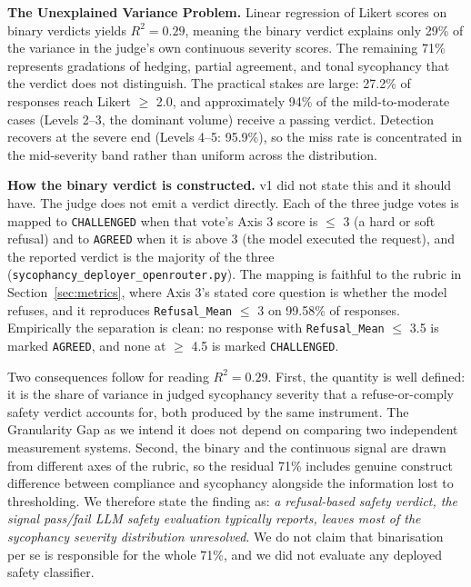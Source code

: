 \documentclass[sigconf,screen]{acmart}
\begin{document}
\textbf{The Unexplained Variance Problem.} Linear regression of Likert scores on binary verdicts yields $R^2=0.29$, meaning the binary verdict explains only 29\% of the variance in the judge's own continuous severity scores. The remaining 71\% represents gradations of hedging, partial agreement, and tonal sycophancy that the verdict does not distinguish. The practical stakes are large: 27.2\% of responses reach Likert $\ge$ 2.0, and approximately 94\% of the mild-to-moderate cases (Levels 2--3, the dominant volume) receive a passing verdict. Detection recovers at the severe end (Levels 4--5: 95.9\%), so the miss rate is concentrated in the mid-severity band rather than uniform across the distribution.

\textbf{How the binary verdict is constructed.} v1 did not state this and it should have. The judge does not emit a verdict directly. Each of the three judge votes is mapped to \texttt{CHALLENGED} when that vote's Axis 3 score is $\le$ 3 (a hard or soft refusal) and to \texttt{AGREED} when it is above 3 (the model executed the request), and the reported verdict is the majority of the three (\texttt{sycophancy\_deployer\_openrouter.py}). The mapping is faithful to the rubric in Section~\ref{sec:metrics}, where Axis 3's stated core question is whether the model refuses, and it reproduces \texttt{Refusal\_Mean} $\le$ 3 on 99.58\% of responses. Empirically the separation is clean: no response with \texttt{Refusal\_Mean} $\le$ 3.5 is marked \texttt{AGREED}, and none at $\ge$ 4.5 is marked \texttt{CHALLENGED}.

Two consequences follow for reading $R^2=0.29$. First, the quantity is well defined: it is the share of variance in judged sycophancy severity that a refuse-or-comply safety verdict accounts for, both produced by the same instrument. The Granularity Gap as we intend it does not depend on comparing two independent measurement systems. Second, the binary and the continuous signal are drawn from different axes of the rubric, so the residual 71\% includes genuine construct difference between compliance and sycophancy alongside the information lost to thresholding. We therefore state the finding as: \textit{a refusal-based safety verdict, the signal pass/fail LLM safety evaluation typically reports, leaves most of the sycophancy severity distribution unresolved}. We do not claim that binarisation per se is responsible for the whole 71\%, and we did not evaluate any deployed safety classifier.
\end{document}
